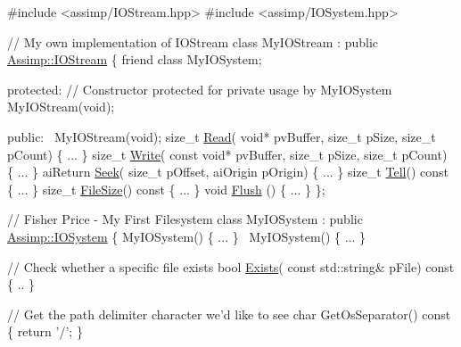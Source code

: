 \begin{DoxyCode}
\textcolor{preprocessor}{#include <assimp/IOStream.hpp>}
\textcolor{preprocessor}{#include <assimp/IOSystem.hpp>}

\textcolor{comment}{// My own implementation of IOStream}
\textcolor{keyword}{class }MyIOStream : \textcolor{keyword}{public} \hyperlink{class_assimp_1_1_i_o_stream}{Assimp::IOStream}
\{
  \textcolor{keyword}{friend} \textcolor{keyword}{class }MyIOSystem;

\textcolor{keyword}{protected}:
  \textcolor{comment}{// Constructor protected for private usage by MyIOSystem}
  MyIOStream(\textcolor{keywordtype}{void});

\textcolor{keyword}{public}:
  ~MyIOStream(\textcolor{keywordtype}{void});
  \textcolor{keywordtype}{size\_t} \hyperlink{class_assimp_1_1_i_o_stream_ae376f641020989d61863b9c6f55c7abf}{Read}( \textcolor{keywordtype}{void}* pvBuffer, \textcolor{keywordtype}{size\_t} pSize, \textcolor{keywordtype}{size\_t} pCount) \{ ... \}
  \textcolor{keywordtype}{size\_t} \hyperlink{class_assimp_1_1_i_o_stream_ad0ca4aae1b8c4d00db391ac3a4171f7b}{Write}( \textcolor{keyword}{const} \textcolor{keywordtype}{void}* pvBuffer, \textcolor{keywordtype}{size\_t} pSize, \textcolor{keywordtype}{size\_t} pCount) \{ ... \}
  aiReturn \hyperlink{class_assimp_1_1_i_o_stream_a5ed0dddf418ab08cf3fc21f3f3032220}{Seek}( \textcolor{keywordtype}{size\_t} pOffset, aiOrigin pOrigin) \{ ... \}
  \textcolor{keywordtype}{size\_t} \hyperlink{class_assimp_1_1_i_o_stream_a316ac6cd16b5a493d1313f792c806194}{Tell}()\textcolor{keyword}{ const }\{ ... \}
  \textcolor{keywordtype}{size\_t} \hyperlink{class_assimp_1_1_i_o_stream_aaa01183d197fb714f28d6c611b6fa058}{FileSize}()\textcolor{keyword}{ const }\{ ... \}
  \textcolor{keywordtype}{void} \hyperlink{class_assimp_1_1_i_o_stream_a7c19952446ece90924b246f087417899}{Flush} () \{ ... \}
\};

\textcolor{comment}{// Fisher Price - My First Filesystem}
\textcolor{keyword}{class }MyIOSystem : \textcolor{keyword}{public} \hyperlink{class_assimp_1_1_i_o_system}{Assimp::IOSystem}
\{
  MyIOSystem() \{ ... \}
  ~MyIOSystem() \{ ... \}

  \textcolor{comment}{// Check whether a specific file exists}
  \textcolor{keywordtype}{bool} \hyperlink{class_assimp_1_1_i_o_system_a7ae6cfaea4957408967463bfc3b84b27}{Exists}( \textcolor{keyword}{const} std::string& pFile)\textcolor{keyword}{ const }\{
    .. 
  \}

  \textcolor{comment}{// Get the path delimiter character we'd like to see}
  \textcolor{keywordtype}{char} GetOsSeparator()\textcolor{keyword}{ const }\{ 
    \textcolor{keywordflow}{return} \textcolor{charliteral}{'/'}; 
  \}


\end{DoxyCode}
